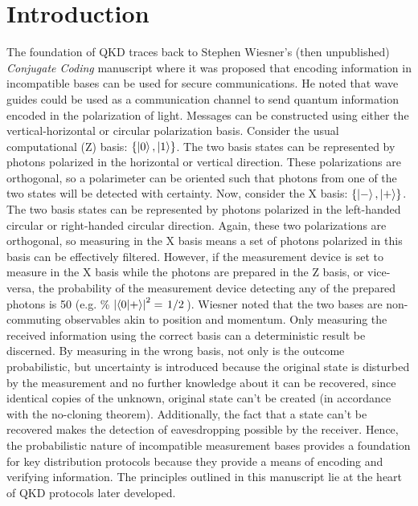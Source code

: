\section{Introduction} \label{intro}
The foundation of QKD traces back to Stephen Wiesner's (then unpublished) \textit{Conjugate Coding} manuscript where it was proposed that encoding information in incompatible bases can be used for secure communications. He noted that wave guides could be used as a communication channel to send quantum information encoded in the polarization of light. Messages can be constructed using either the vertical-horizontal or circular polarization basis. Consider the usual computational (Z) basis: $\left\{\ket{0}, \ket{1}\right\}$. The two basis states can be represented by photons polarized in the horizontal or vertical direction. These polarizations are orthogonal, so a polarimeter can be oriented such that photons from one of the two states will be detected with certainty. Now, consider the X basis: $\left\{\ket{-}, \ket{+}\right\}$. The two basis states can be represented by photons polarized in the left-handed circular or right-handed circular direction. Again, these two polarizations are orthogonal, so measuring in the X basis means a set of photons polarized in this basis can be effectively filtered. However, if the measurement device is set to measure in the X basis while the photons are prepared in the Z basis, or vice-versa, the probability of the measurement device detecting any of the prepared photons is 50 (e.g. \% $\abs{\bra{0}\ket{+}}^2 = \flatfrac{1}{2}$). Wiesner noted that the two bases are non-commuting observables akin to position and momentum. Only measuring the received information using the correct basis can a deterministic result be discerned. By measuring in the wrong basis, not only is the outcome probabilistic, but uncertainty is introduced because the original state is disturbed by the measurement and no further knowledge about it can be recovered, since identical copies of the unknown, original state can't be created (in accordance with the no-cloning theorem). Additionally, the fact that a state can't be recovered makes the detection of eavesdropping possible by the receiver. Hence, the probabilistic nature of incompatible measurement bases provides a foundation for key distribution protocols because they provide a means of encoding and verifying information. The principles outlined in this manuscript lie at the heart of QKD protocols later developed. \cite{Wiesner}

